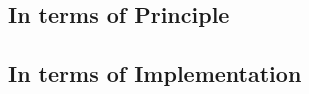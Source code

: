 \documentclass{article}
\begin{document}
    \subsection{In terms of Principle}
    \clearpage
    
    \subsection{In terms of Implementation}    
    \clearpage
    
    
    
    
    
\end{document}
